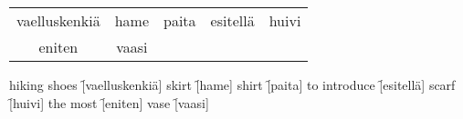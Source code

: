 \begin{center}
  \begin{tabular}{|c c c c c|}
    \hline
    vaelluskenkiä & hame & paita & esitellä & huivi \\
    eniten & vaasi & & & \\
    \hline
  \end{tabular}
\end{center}

\begin{questions}
  \begin{multicols}{3}
    \raggedcolumns
    \question hiking shoes \f[vaelluskenkiä]
    \question skirt        \f[hame]
    \question shirt        \f[paita]
    \question to introduce \f[esitellä]
    \question scarf        \f[huivi]
    \question the most     \f[eniten]
    \question vase         \f[vaasi]
  \end{multicols}
\end{questions}
